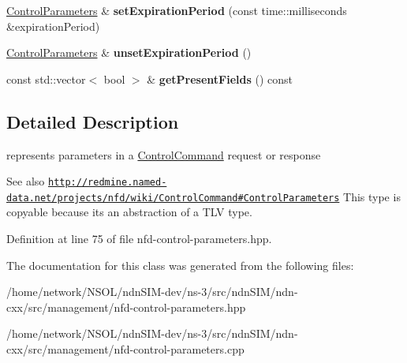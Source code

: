 \begin{DoxyCompactItemize}
\item 
\hyperlink{classndn_1_1nfd_1_1ControlParameters}{Control\+Parameters} \& {\bfseries set\+Expiration\+Period} (const time\+::milliseconds \&expiration\+Period)\hypertarget{classndn_1_1nfd_1_1ControlParameters_a8e13d0a8dc8286947be2a5602e6e9ef3}{}\label{classndn_1_1nfd_1_1ControlParameters_a8e13d0a8dc8286947be2a5602e6e9ef3}

\item 
\hyperlink{classndn_1_1nfd_1_1ControlParameters}{Control\+Parameters} \& {\bfseries unset\+Expiration\+Period} ()\hypertarget{classndn_1_1nfd_1_1ControlParameters_a5f664b6d85b69732777e658a4b16e4f8}{}\label{classndn_1_1nfd_1_1ControlParameters_a5f664b6d85b69732777e658a4b16e4f8}

\item 
const std\+::vector$<$ bool $>$ \& {\bfseries get\+Present\+Fields} () const\hypertarget{classndn_1_1nfd_1_1ControlParameters_a322e613571e5df77a1ee02aa393697c4}{}\label{classndn_1_1nfd_1_1ControlParameters_a322e613571e5df77a1ee02aa393697c4}

\end{DoxyCompactItemize}


\subsection{Detailed Description}
represents parameters in a \hyperlink{classndn_1_1nfd_1_1ControlCommand}{Control\+Command} request or response 

\begin{DoxySeeAlso}{See also}
\href{http://redmine.named-data.net/projects/nfd/wiki/ControlCommand#ControlParameters}{\tt http\+://redmine.\+named-\/data.\+net/projects/nfd/wiki/\+Control\+Command\#\+Control\+Parameters}  This type is copyable because it\textquotesingle{}s an abstraction of a T\+LV type. 
\end{DoxySeeAlso}


Definition at line 75 of file nfd-\/control-\/parameters.\+hpp.



The documentation for this class was generated from the following files\+:\begin{DoxyCompactItemize}
\item 
/home/network/\+N\+S\+O\+L/ndn\+S\+I\+M-\/dev/ns-\/3/src/ndn\+S\+I\+M/ndn-\/cxx/src/management/nfd-\/control-\/parameters.\+hpp\item 
/home/network/\+N\+S\+O\+L/ndn\+S\+I\+M-\/dev/ns-\/3/src/ndn\+S\+I\+M/ndn-\/cxx/src/management/nfd-\/control-\/parameters.\+cpp\end{DoxyCompactItemize}
